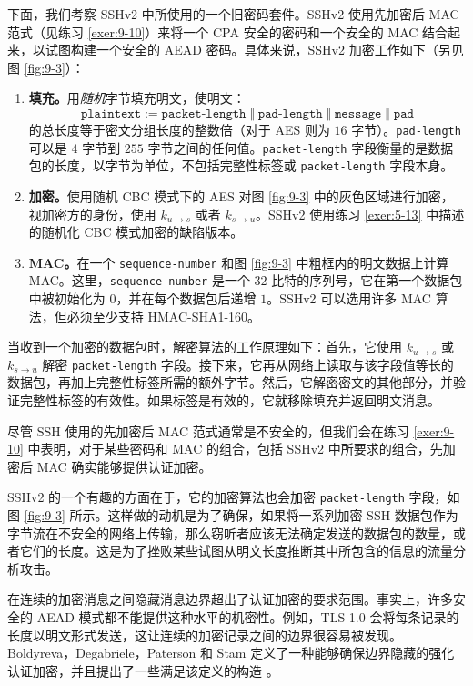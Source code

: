 \begin{snote}[SSHv2 加密。]
下面，我们考察 SSHv2 中所使用的一个旧密码套件。SSHv2 使用先加密后 MAC 范式（见练习 \ref{exer:9-10}）来将一个 CPA 安全的密码和一个安全的 MAC 结合起来，以试图构建一个安全的 AEAD 密码。具体来说，SSHv2 加密工作如下（另见图 \ref{fig:9-3}）：
\begin{enumerate}
	\item \textbf{填充。}用\emph{随机}字节填充明文，使明文：
	\[
	\texttt{plaintext}
	:=
	\texttt{packet-length}
	\;\Vert\;
	\texttt{pad-length}
	\;\Vert\;
	\texttt{message}
	\;\Vert\;
	\texttt{pad}
	\]
	的总长度等于密文分组长度的整数倍（对于 AES 则为 $16$ 字节）。\texttt{pad-length} 可以是 $4$ 字节到 $255$ 字节之间的任何值。\texttt{packet-length} 字段衡量的是数据包的长度，以字节为单位，不包括完整性标签或 \texttt{packet-length} 字段本身。
	\item \textbf{加密。}使用随机 CBC 模式下的 AES 对图 \ref{fig:9-3} 中的灰色区域进行加密，视加密方的身份，使用 $k_{u\to s}$ 或者 $k_{s\to u}$。SSHv2 使用练习 \ref{exer:5-13} 中描述的随机化 CBC 模式加密的缺陷版本。
	\item \textbf{MAC。}在一个 \texttt{sequence-number} 和图 \ref{fig:9-3} 中粗框内的明文数据上计算 MAC。这里，\texttt{sequence-\allowbreak number} 是一个 $32$ 比特的序列号，它在第一个数据包中被初始化为 $0$，并在每个数据包后递增 $1$。SSHv2 可以选用许多 MAC 算法，但必须至少支持 HMAC-SHA1-160。
\end{enumerate}

当收到一个加密的数据包时，解密算法的工作原理如下：首先，它使用 $k_{u\to s}$ 或 $k_{s\to u}$ 解密 \texttt{packet-}\allowbreak\texttt{length} 字段。接下来，它再从网络上读取与该字段值等长的数据包，再加上完整性标签所需的额外字节。然后，它解密密文的其他部分，并验证完整性标签的有效性。如果标签是有效的，它就移除填充并返回明文消息。

尽管 SSH 使用的先加密后 MAC 范式通常是不安全的，但我们会在练习 \ref{exer:9-10} 中表明，对于某些密码和 MAC 的组合，包括 SSHv2 中所要求的组合，先加密后 MAC 确实能够提供认证加密。
\end{snote}

\begin{snote}
SSHv2 的一个有趣的方面在于，它的加密算法也会加密 \texttt{packet-length} 字段，如图 \ref{fig:9-3} 所示。这样做的动机是为了确保，如果将一系列加密 SSH 数据包作为字节流在不安全的网络上传输，那么窃听者应该无法确定发送的数据包的数量，或者它们的长度。这是为了挫败某些试图从明文长度推断其中所包含的信息的流量分析攻击。

在连续的加密消息之间隐藏消息边界超出了认证加密的要求范围。事实上，许多安全的 AEAD 模式都不能提供这种水平的机密性。例如，TLS 1.0 会将每条记录的长度以明文形式发送，这让连续的加密记录之间的边界很容易被发现。Boldyreva，Degabriele，Paterson 和 Stam 定义了一种能够确保边界隐藏的强化认证加密，并且提出了一些满足该定义的构造 \cite{boldyreva2012security}。
\end{snote}

